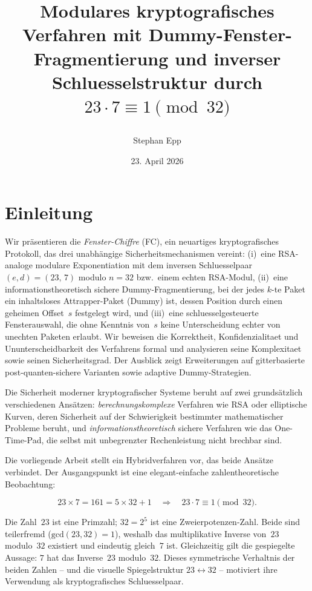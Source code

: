﻿\documentclass[12pt, a4paper]{article}
\title{\bfseries Modulares kryptografisches Verfahren mit
  Dummy-Fenster-Fragmentierung und inverser Schluesselstruktur
  durch $23 \cdot 7 \equiv 1 \pmod{32}$\par}
\author{Stephan Epp}
\date{23. April 2026}
\theoremstyle{plain}
\theoremstyle{definition}
\theoremstyle{remark}
\newcommand{\GCD}{\mathrm{gcd}}
\begin{document}
\maketitle
\tableofcontents
\newpage

\section{Einleitung}
\label{sec:einleitung}
Wir pr\"asentieren die \emph{Fenster-Chiffre} (FC), ein neuartiges
kryptografisches Protokoll, das drei unabh\"angige Sicherheitsmechanismen
vereint: (i)~eine RSA-analoge modulare Exponentiation mit dem
inversen Schluesselpaar $(e,d) = (23,\,7)$ modulo $n = 32$ bzw.\ einem
echten RSA-Modul, (ii)~eine informationstheoretisch sichere
Dummy-Fragmentierung, bei der jedes $k$-te Paket ein inhaltsloses
Attrapper-Paket (Dummy) ist, dessen Position durch einen geheimen
Offset~$s$ festgelegt wird, und (iii)~eine schluesselgesteuerte
Fensterauswahl, die ohne Kenntnis von~$s$ keine Unterscheidung echter
von unechten Paketen erlaubt.
Wir beweisen die Korrektheit, Konfidenzialitaet und Ununterscheidbarkeit
des Verfahrens formal und analysieren seine Komplexitaet sowie
seinen Sicherheitsgrad. Der Ausblick zeigt Erweiterungen auf gitterbasierte
post-quanten-sichere Varianten sowie adaptive Dummy-Strategien.

Die Sicherheit moderner kryptografischer Systeme beruht auf zwei grunds\"atzlich
verschiedenen Ans\"atzen: \emph{berechnungskomplexe} Verfahren wie RSA oder
elliptische Kurven, deren Sicherheit auf der Schwierigkeit bestimmter
mathematischer Probleme beruht, und \emph{informationstheoretisch} sichere
Verfahren wie das One-Time-Pad, die selbst mit unbegrenzter Rechenleistung
nicht brechbar sind.

Die vorliegende Arbeit stellt ein Hybridverfahren vor, das beide Ans\"atze
verbindet. Der Ausgangspunkt ist eine elegant-einfache zahlentheoretische
Beobachtung:

\begin{equation}
  23 \times 7 = 161 = 5 \times 32 + 1
  \quad\Longrightarrow\quad
  23 \cdot 7 \equiv 1 \pmod{32}.
  \label{eq:grundbeobachtung}
\end{equation}

Die Zahl~$23$ ist eine Primzahl; $32 = 2^5$ ist eine Zweierpotenzen-Zahl.
Beide sind teilerfremd ($\GCD(23,32)=1$), weshalb das multiplikative
Inverse von~$23$ modulo~$32$ existiert und eindeutig gleich~$7$ ist.
Gleichzeitig gilt die gespiegelte Aussage: $7$ hat das Inverse~$23$ modulo~$32$.
Dieses symmetrische Verhaltnis der beiden Zahlen -- und die visuelle
Spiegelstruktur $23 \leftrightarrow 32$ -- motiviert ihre Verwendung als
kryptografisches Schluesselpaar.
\end{document}
